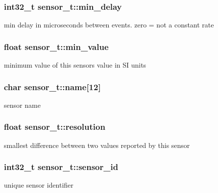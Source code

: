 \subsubsection[{\texorpdfstring{min\+\_\+delay}{min_delay}}]{\setlength{\rightskip}{0pt plus 5cm}int32\+\_\+t sensor\+\_\+t\+::min\+\_\+delay}\hypertarget{structsensor__t_a1cd271377ff25ec9ca54886f876c87ec}{}\label{structsensor__t_a1cd271377ff25ec9ca54886f876c87ec}
min delay in microseconds between events. zero = not a constant rate 
\subsubsection[{\texorpdfstring{min\+\_\+value}{min_value}}]{\setlength{\rightskip}{0pt plus 5cm}float sensor\+\_\+t\+::min\+\_\+value}\hypertarget{structsensor__t_a4556ed82a0389a7f6af25a6fd0ee1431}{}\label{structsensor__t_a4556ed82a0389a7f6af25a6fd0ee1431}
minimum value of this sensor\textquotesingle{}s value in SI units 
\subsubsection[{\texorpdfstring{name}{name}}]{\setlength{\rightskip}{0pt plus 5cm}char sensor\+\_\+t\+::name\mbox{[}12\mbox{]}}\hypertarget{structsensor__t_a4383b68d36f9dc4096d83583c3b009bf}{}\label{structsensor__t_a4383b68d36f9dc4096d83583c3b009bf}
sensor name 
\subsubsection[{\texorpdfstring{resolution}{resolution}}]{\setlength{\rightskip}{0pt plus 5cm}float sensor\+\_\+t\+::resolution}\hypertarget{structsensor__t_a926aba3216afd50e62c0a6cdbcc7433a}{}\label{structsensor__t_a926aba3216afd50e62c0a6cdbcc7433a}
smallest difference between two values reported by this sensor 
\subsubsection[{\texorpdfstring{sensor\+\_\+id}{sensor_id}}]{\setlength{\rightskip}{0pt plus 5cm}int32\+\_\+t sensor\+\_\+t\+::sensor\+\_\+id}\hypertarget{structsensor__t_a224f6201d59873cc1b6e9dd8a1894736}{}\label{structsensor__t_a224f6201d59873cc1b6e9dd8a1894736}
unique sensor identifier 
